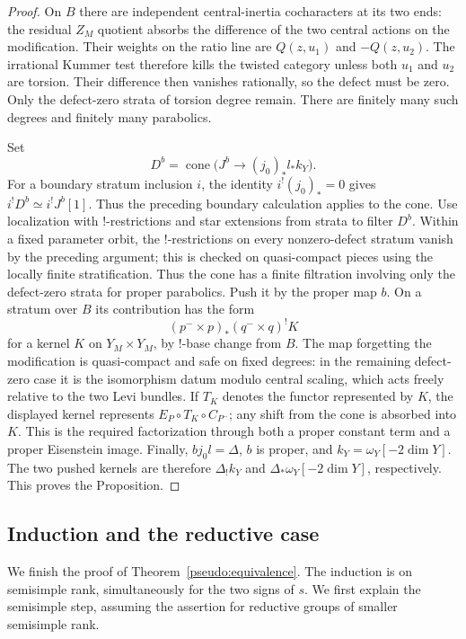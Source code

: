 \begin{proof}
On $B$ there are independent central-inertia cocharacters at its two ends:
the residual $Z_M$ quotient absorbs the difference of the two central
actions on the modification.  Their weights on the ratio line are
$Q(z,u_1)$ and $-Q(z,u_2)$.  The irrational Kummer test therefore kills the
twisted category unless both $u_1$ and $u_2$ are torsion.  Their difference
then vanishes rationally, so the defect must be zero.  Only the defect-zero
strata of torsion degree remain.  There are finitely many such degrees and
finitely many parabolics.

Set
\[
 D^b=\operatorname{cone}\bigl(J^b\longrightarrow(j_0)_*l_*k_Y\bigr).
\]
For a boundary stratum inclusion $i$, the identity
$i^!(j_0)_*=0$ gives $i^!D^b\simeq i^!J^b[1]$.  Thus the preceding
boundary calculation applies to the cone.  Use localization with
!-restrictions and star extensions from strata to filter $D^b$.
Within a fixed parameter orbit, the !-restrictions on every nonzero-defect
stratum vanish by the preceding argument; this is checked on
quasi-compact pieces using the locally finite stratification.  Thus the
cone has a finite filtration involving only the defect-zero strata for
proper parabolics.  Push it by the proper map $b$.  On a stratum over $B$
its contribution has the form
\[
 (p^-\times p)_*(q^-\times q)^!K
\]
for a kernel $K$ on $Y_M\times Y_M$, by !-base change from $B$.  The map
forgetting the modification is quasi-compact and safe on fixed degrees:
in the remaining defect-zero case it is the isomorphism datum modulo
central scaling, which acts freely relative to the two Levi bundles.
If $T_K$ denotes the functor represented by $K$, the displayed kernel
represents $E_P\circ T_K\circ C_{P^-}$; any shift from the cone is
absorbed into $K$.  This is the required factorization through both a
proper constant term and a proper Eisenstein image.  Finally, $bj_0l=\Delta$, $b$ is proper, and
$k_Y=\omega_Y[-2\dim Y]$.  The two pushed kernels are therefore
$\Delta_!k_Y$ and $\Delta_*\omega_Y[-2\dim Y]$, respectively.  This proves
the Proposition.
\end{proof}

\subsection{Induction and the reductive case}

We finish the proof of Theorem~\ref{pseudo:equivalence}.  The induction is
on semisimple rank, simultaneously for the two signs of $s$.  We first
explain the semisimple step, assuming the assertion for reductive groups
of smaller semisimple rank.


